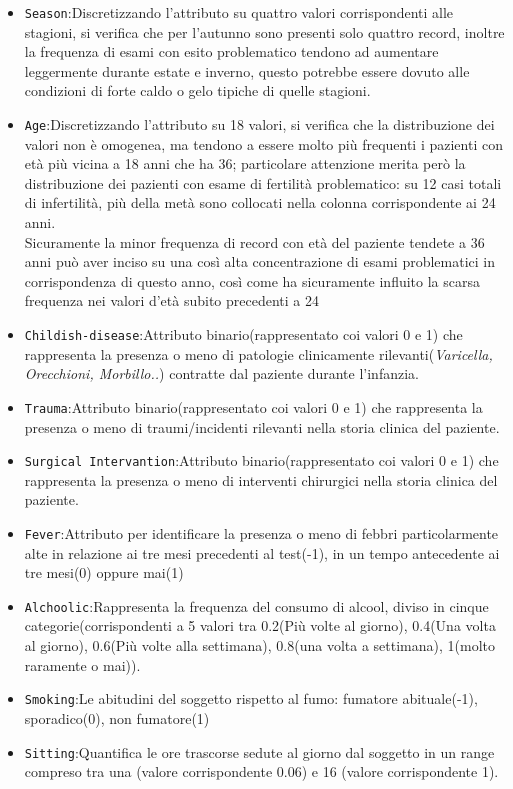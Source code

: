 \begin{itemize}
	\item \texttt{Season}:Discretizzando l'attributo su quattro valori corrispondenti alle stagioni, si verifica che per l'autunno sono presenti solo quattro record, inoltre la frequenza di esami con esito problematico tendono ad aumentare leggermente durante estate e inverno, questo potrebbe essere dovuto alle condizioni di forte caldo o gelo tipiche di quelle stagioni.
	
	\item \texttt{Age}:Discretizzando l'attributo su 18 valori, si verifica che la distribuzione dei valori non è omogenea, ma tendono a essere molto più frequenti i pazienti con età più vicina a 18 anni che ha 36; particolare attenzione merita però la distribuzione dei pazienti con esame di fertilità problematico: su 12 casi totali di infertilità, più della metà sono collocati nella colonna corrispondente ai 24 anni.\\
	Sicuramente la minor frequenza di record con età del paziente tendete a 36 anni può aver inciso su una così alta concentrazione di esami problematici in corrispondenza di questo anno, così come ha sicuramente influito la scarsa frequenza nei valori d'età subito precedenti a 24
	
	\item \texttt{Childish-disease}:Attributo binario(rappresentato coi valori 0 e 1) che rappresenta la presenza o meno di patologie clinicamente rilevanti(\textit{Varicella, Orecchioni, Morbillo..}) contratte dal paziente durante l'infanzia.
	
	\item \texttt{Trauma}:Attributo binario(rappresentato coi valori 0 e 1) che rappresenta la presenza o meno di traumi/incidenti rilevanti nella storia clinica del paziente.	
	
	\item \texttt{Surgical Intervantion}:Attributo binario(rappresentato coi valori 0 e 1) che rappresenta la presenza o meno di interventi chirurgici nella storia clinica del paziente.
	
	\item \texttt{Fever}:Attributo per identificare la presenza o meno di febbri particolarmente alte in relazione ai tre mesi precedenti al test(-1), in un tempo antecedente ai tre mesi(0) oppure mai(1)
	
	\item \texttt{Alchoolic}:Rappresenta la frequenza del consumo di alcool, diviso in cinque categorie(corrispondenti a 5 valori tra 0.2(Più volte al giorno), 0.4(Una volta al giorno), 0.6(Più volte alla settimana), 0.8(una volta a settimana), 1(molto raramente o mai)).
	
	\item \texttt{Smoking}:Le abitudini del soggetto rispetto al fumo: fumatore abituale(-1), sporadico(0), non fumatore(1)
	
	\item \texttt{Sitting}:Quantifica le ore trascorse sedute al giorno dal soggetto in un range compreso tra una (valore corrispondente 0.06) e 16 (valore corrispondente 1).
	
\end{itemize} 
